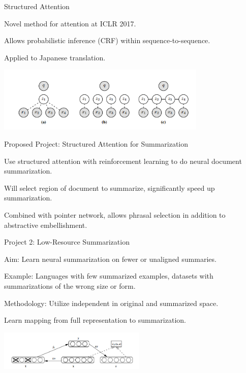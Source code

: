 \documentclass{beamer}
\let\tempone\itemize
\let\temptwo\enditemize
\renewenvironment{itemize}{\tempone\addtolength{\itemsep}{0.5\baselineskip}}{\temptwo}
\newcommand{\Cite}[1]{{\footnotesize \citep{#1}}}
\begin{document}
\begin{frame}{Structured Attention \Cite{kim2017structured}}
  \begin{itemize}
  \item Novel method for attention at ICLR 2017.
  \item Allows probabilistic inference (CRF) within sequence-to-sequence.
  \item Applied to Japanese translation.
  \end{itemize}
  
  \begin{center}
    \includegraphics[width=10cm]{structattn}
  \end{center}
\end{frame}

\begin{frame}{Proposed Project: Structured Attention for Summarization}
  \begin{itemize}
  \item Use structured attention with reinforcement learning to 
    do neural document summarization.
  \item Will select region of document to summarize, significantly 
    speed up summarization.
  \item Combined with pointer network, allows phrasal selection 
    in addition to abstractive embellishment.
  \end{itemize}
\end{frame}



\begin{frame}{Project 2: Low-Resource Summarization}
  \begin{itemize}
  \item Aim: Learn neural summarization on fewer or unaligned summaries.
  \item Example: Languages with few summarized examples, 
    datasets with summarizations of the wrong size or form.
  \item Methodology: Utilize independent  in 
    original and summarized space. 
  \item Learn mapping from full representation to summarization.  
  \end{itemize}

  \begin{center}
    \includegraphics[width=7cm]{denoising}
  \end{center}
\end{frame}
\end{document}

